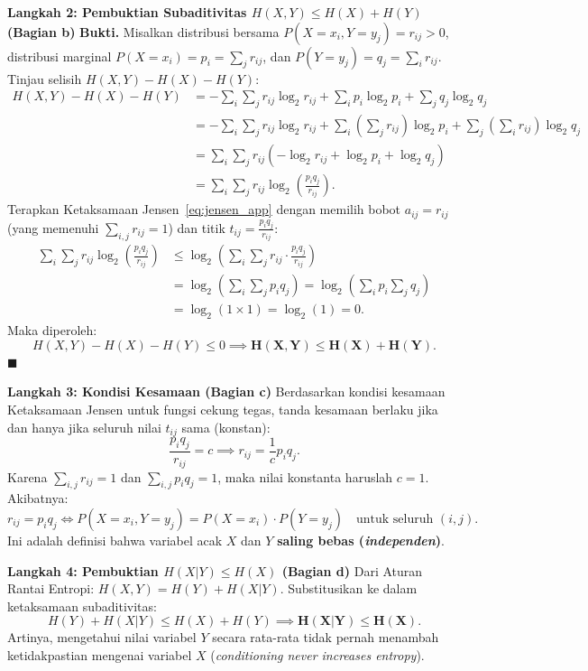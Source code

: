 \documentclass[11pt,a4paper]{article}
\newenvironment{proof}{\noindent\textbf{Bukti.}}{\hfill$\blacksquare$\vspace{0.3em}}
\begin{document}
\noindent\textbf{Langkah 2: Pembuktian Subaditivitas $H(X, Y) \le H(X) + H(Y)$ (Bagian b)}
\begin{proof}
Misalkan distribusi bersama $P(X = x_i, Y = y_j) = r_{ij} > 0$, distribusi marginal $P(X = x_i) = p_i = \sum_j r_{ij}$, dan $P(Y = y_j) = q_j = \sum_i r_{ij}$.
Tinjau selisih $H(X, Y) - H(X) - H(Y)$:
\begin{align*}
H(X, Y) - H(X) - H(Y) &= -\sum_{i}\sum_j r_{ij}\log_2 r_{ij} + \sum_i p_i \log_2 p_i + \sum_j q_j \log_2 q_j \\
&= -\sum_i \sum_j r_{ij}\log_2 r_{ij} + \sum_i \left(\sum_j r_{ij}\right)\log_2 p_i + \sum_j \left(\sum_i r_{ij}\right)\log_2 q_j \\
&= \sum_i \sum_j r_{ij} \left( -\log_2 r_{ij} + \log_2 p_i + \log_2 q_j \right) \\
&= \sum_i \sum_j r_{ij} \log_2\left( \frac{p_i q_j}{r_{ij}} \right).
\end{align*}
Terapkan Ketaksamaan Jensen~\eqref{eq:jensen_app} dengan memilih bobot $a_{ij} = r_{ij}$ (yang memenuhi $\sum_{i,j} r_{ij} = 1$) dan titik $t_{ij} = \frac{p_i q_j}{r_{ij}}$:
\begin{align*}
\sum_i \sum_j r_{ij} \log_2\left( \frac{p_i q_j}{r_{ij}} \right) &\le \log_2\left( \sum_i \sum_j r_{ij} \cdot \frac{p_i q_j}{r_{ij}} \right) \\
&= \log_2\left( \sum_i \sum_j p_i q_j \right) = \log_2\left( \sum_i p_i \sum_j q_j \right) \\
&= \log_2(1 \times 1) = \log_2(1) = 0.
\end{align*}
Maka diperoleh:
\[
H(X, Y) - H(X) - H(Y) \le 0 \implies \mathbf{H(X, Y) \le H(X) + H(Y)}.
\]
\end{proof}

\noindent\textbf{Langkah 3: Kondisi Kesamaan (Bagian c)}
Berdasarkan kondisi kesamaan Ketaksamaan Jensen untuk fungsi cekung tegas, tanda kesamaan berlaku jika dan hanya jika seluruh nilai $t_{ij}$ sama (konstan):
\[
\frac{p_i q_j}{r_{ij}} = c \implies r_{ij} = \frac{1}{c} p_i q_j.
\]
Karena $\sum_{i,j} r_{ij} = 1$ dan $\sum_{i,j} p_i q_j = 1$, maka nilai konstanta haruslah $c = 1$.
Akibatnya:
\[
r_{ij} = p_i q_j \iff P(X = x_i, Y = y_j) = P(X = x_i) \cdot P(Y = y_j) \quad \text{untuk seluruh } (i, j).
\]
Ini adalah definisi bahwa variabel acak $X$ dan $Y$ \textbf{saling bebas (\textit{independen})}.

\noindent\textbf{Langkah 4: Pembuktian $H(X|Y) \le H(X)$ (Bagian d)}
Dari Aturan Rantai Entropi: $H(X, Y) = H(Y) + H(X|Y)$.
Substitusikan ke dalam ketaksamaan subaditivitas:
\[
H(Y) + H(X|Y) \le H(X) + H(Y) \implies \mathbf{H(X|Y) \le H(X)}.
\]
Artinya, mengetahui nilai variabel $Y$ secara rata-rata tidak pernah menambah ketidakpastian mengenai variabel $X$ (\textit{conditioning never increases entropy}).
\end{document}
